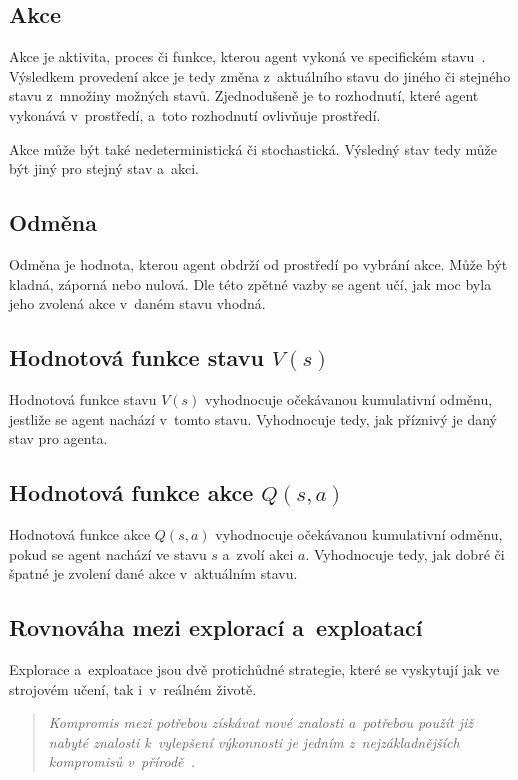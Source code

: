 \subsection{Akce}\label{subsec:akce}

Akce je aktivita, proces či funkce, kterou agent vykoná ve specifickém stavu~\cite{ActionCo67}.
Výsledkem provedení akce je tedy změna z~aktuálního stavu do jiného či stejného stavu z~množiny možných stavů.
Zjednodušeně je to rozhodnutí, které agent vykonává v~prostředí, a~toto rozhodnutí ovlivňuje prostředí.

Akce může být také nedeterministická či stochastická.
Výsledný stav tedy může být jiný pro stejný stav a~akci.
  
\subsection{Odměna}\label{subsec:odmena}

  Odměna je hodnota, kterou agent obdrží od prostředí po vybrání akce.
  Může být kladná, záporná nebo nulová.
  Dle této zpětné vazby se agent učí, jak moc byla jeho zvolená akce v~daném stavu vhodná.

\subsection{Hodnotová funkce stavu $V(s)$}

Hodnotová funkce stavu \emph{$V(s)$} vyhodnocuje očekávanou kumulativní odměnu, jestliže se agent nachází v~tomto stavu.
Vyhodnocuje tedy, jak příznivý je daný stav pro agenta.

\subsection{Hodnotová funkce akce $Q(s, a)$}
\label{subsubsec:q_function}

Hodnotová funkce akce \emph{$Q(s, a)$} vyhodnocuje očekávanou kumulativní odměnu, pokud se agent nachází ve stavu $s$ a~zvolí akci $a$.
Vyhodnocuje tedy, jak dobré či špatné je zvolení dané akce v~aktuálním stavu.


\subsection{Rovnováha mezi explorací a~exploatací}
\label{subsec:exploration-exploitation-dillemma}
Explorace a~exploatace jsou dvě protichůdné strategie, které se vyskytují jak ve strojovém učení, tak i~v~reálném životě.
\begin{quote}
  \emph{Kompromis mezi potřebou získávat nové znalosti a~potřebou použít již nabyté znalosti k~vylepšení výkonnosti je jedním z~nejzákladnějších kompromisů v~přírodě~\cite{Exploitation_Exploration}.}
\end{quote}


